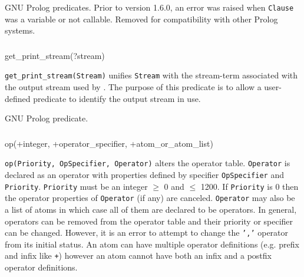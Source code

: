 \Portability

GNU Prolog predicates. Prior to version 1.6.0, an error was raised
when \texttt{Clause} was a variable or not callable. Removed
for compatibility with other Prolog systems.

\subsubsection{}

\begin{TemplatesOneCol}
get\_print\_stream(?stream)

\end{TemplatesOneCol}

\Description

\texttt{get\_print\_stream(Stream)} unifies \texttt{Stream} with the
stream-term associated with the output stream used by 
. The purpose of this predicate is to allow a
user-defined  predicate to identify the output stream in
use.

\begin{PlErrors}


\end{PlErrors}

\Portability

GNU Prolog predicate.

\subsubsection{\label{op/3:(Term-input/output)}}

\begin{TemplatesOneCol}
op(+integer, +operator\_specifier, +atom\_or\_atom\_list)

\end{TemplatesOneCol}

\Description

\texttt{op(Priority, OpSpecifier, Operator)} alters the operator table.
\texttt{Operator} is declared as an operator with properties defined by
specifier \texttt{OpSpecifier} and \texttt{Priority}. \texttt{Priority} must
be an integer $\geq$ 0 and $\leq$ 1200. If \texttt{Priority} is 0 then the
operator properties of \texttt{Operator} (if any) are canceled.
\texttt{Operator} may also be a list of atoms in which case all of them are
declared to be operators. In general, operators can be removed from
the operator table and their priority or specifier can be changed. However,
it is an error to attempt to change the \texttt{','} operator from its
initial status. An atom can have multiple operator definitions (e.g.
prefix and infix like \texttt{+}) however an atom cannot have both an
infix and a postfix operator definitions.

